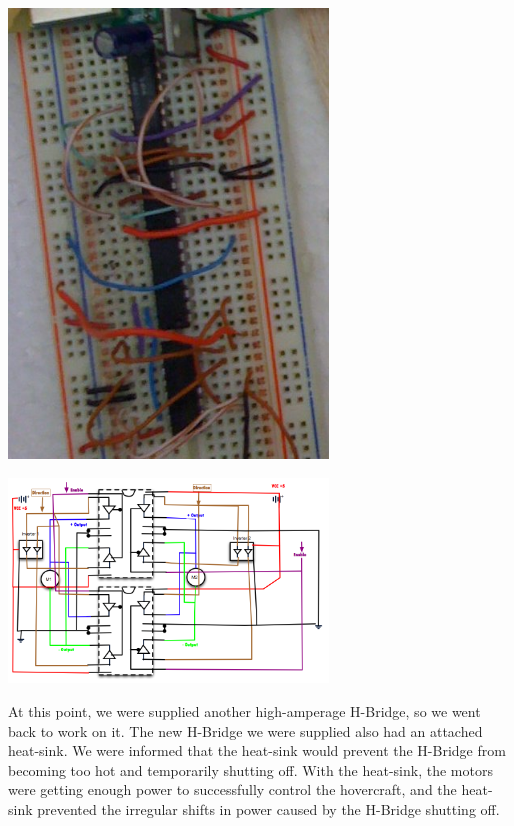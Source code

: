 \begin{center}
  \includegraphics[width=85mm]{imageSources/designProblemsHBridge1.png}
\end{center}
\label{HbridgeWiring}

\begin{center}
  \includegraphics[width=85mm]{imageSources/designProblemsHBridge2.png}
\end{center}
\label{HbridgeWiring2}

At this point, we were supplied another high-amperage H-Bridge, so we went back to work on it. The new H-Bridge we were supplied also had an attached heat-sink. We were informed that the heat-sink would prevent the H-Bridge from becoming too hot and temporarily shutting off. With the heat-sink, the motors were getting enough power to successfully control the hovercraft, and the heat-sink prevented the irregular shifts in power caused by the H-Bridge shutting off.

